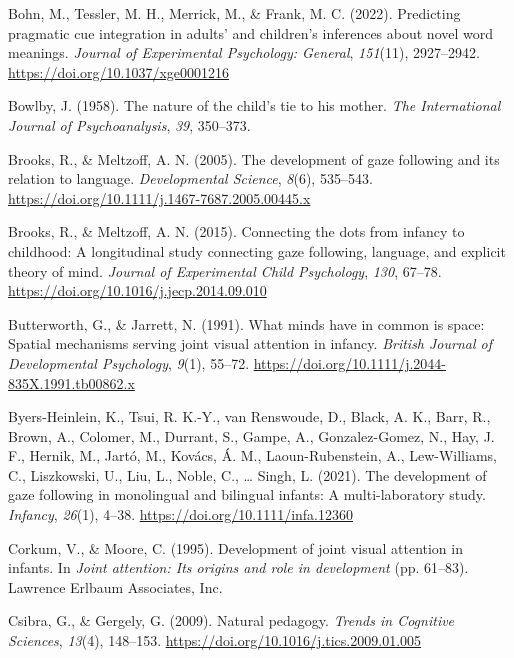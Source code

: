 \documentclass[
]{scrbook}
\newlength{\cslhangindent}
\newenvironment{CSLReferences}[2] %
 {\begin{list}{}{%
  \setlength{\itemindent}{0pt}
  \setlength{\leftmargin}{0pt}
  \setlength{\parsep}{0pt}
  \ifodd #1
   \setlength{\leftmargin}{\cslhangindent}
   \setlength{\itemindent}{-1\cslhangindent}
  \fi
  \setlength{\itemsep}{#2\baselineskip}}}
 {\end{list}}
\begin{document}
\begin{CSLReferences}{1}{0}
Bohn, M., Tessler, M. H., Merrick, M., \& Frank, M. C. (2022). Predicting pragmatic cue integration in adults' and children's inferences about novel word meanings. \emph{Journal of Experimental Psychology: General}, \emph{151}(11), 2927--2942. \url{https://doi.org/10.1037/xge0001216}

Bowlby, J. (1958). The nature of the child's tie to his mother. \emph{The International Journal of Psychoanalysis}, \emph{39}, 350--373.

Brooks, R., \& Meltzoff, A. N. (2005). The development of gaze following and its relation to language. \emph{Developmental Science}, \emph{8}(6), 535--543. \url{https://doi.org/10.1111/j.1467-7687.2005.00445.x}

Brooks, R., \& Meltzoff, A. N. (2015). Connecting the dots from infancy to childhood: {A} longitudinal study connecting gaze following, language, and explicit theory of mind. \emph{Journal of Experimental Child Psychology}, \emph{130}, 67--78. \url{https://doi.org/10.1016/j.jecp.2014.09.010}

Butterworth, G., \& Jarrett, N. (1991). What minds have in common is space: {Spatial} mechanisms serving joint visual attention in infancy. \emph{British Journal of Developmental Psychology}, \emph{9}(1), 55--72. \url{https://doi.org/10.1111/j.2044-835X.1991.tb00862.x}

Byers-Heinlein, K., Tsui, R. K.-Y., van Renswoude, D., Black, A. K., Barr, R., Brown, A., Colomer, M., Durrant, S., Gampe, A., Gonzalez-Gomez, N., Hay, J. F., Hernik, M., Jartó, M., Kovács, Á. M., Laoun-Rubenstein, A., Lew-Williams, C., Liszkowski, U., Liu, L., Noble, C., \ldots{} Singh, L. (2021). The development of gaze following in monolingual and bilingual infants: {A} multi-laboratory study. \emph{Infancy}, \emph{26}(1), 4--38. \url{https://doi.org/10.1111/infa.12360}

Corkum, V., \& Moore, C. (1995). Development of joint visual attention in infants. In \emph{Joint attention: {Its} origins and role in development} (pp. 61--83). Lawrence Erlbaum Associates, Inc.

Csibra, G., \& Gergely, G. (2009). Natural pedagogy. \emph{Trends in Cognitive Sciences}, \emph{13}(4), 148--153. \url{https://doi.org/10.1016/j.tics.2009.01.005}


\end{CSLReferences}
\end{document}

